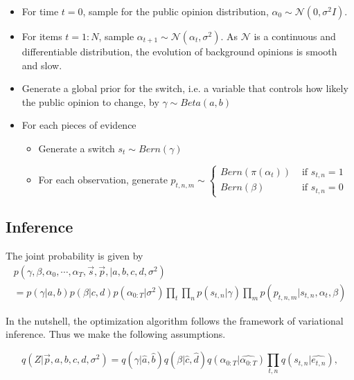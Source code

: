 \documentclass[runningheads]{llncs}
\newcommand{\Gaussian}{\mathcal{N}}
\begin{document}
\vspace{-0.6cm}
\begin{itemize}
\item For time $t=0$, sample  for the public opinion distribution, $\alpha_0\sim \Gaussian(0,\sigma^2 I)$.
\item For items $t=1: N$, sample $\alpha_{t+1}\sim \Gaussian(\alpha_t,\sigma^2)$. As $\Gaussian$ is a continuous and differentiable distribution, the evolution of background opinions is smooth and slow.
\item Generate a global prior for the switch, i.e. a variable that controls how likely the public opinion to change, by $\gamma\sim Beta(a,b)$
\end{itemize}
\begin{itemize}
\item For each pieces of evidence
\begin{itemize}
\item Generate a switch $s_t \sim Bern(\gamma)$
\item For each observation, generate $p_{t,n,m}\sim \begin{cases}
Bern(\pi(\alpha_t)) & \text{ if } s_{t,n}= 1\\ 
Bern(\beta) & \text{ if } s_{t,n}= 0 
\end{cases}$
\end{itemize}
\end{itemize}





\vspace{-0.6cm}
\subsection{Inference}
The joint probability is given by
\begin{multline}
    p(\gamma,\beta,\alpha_0,\cdots,\alpha_T, \vec{s},\vec{p}, |a,b,c,d,\sigma^2) \\
    =    p(\gamma|a,b) p(\beta|c,d)  p(\alpha_{0:T}|\sigma^2) \prod_t \prod_ n p(s_{t,n}|\gamma) \prod_m p(p_{t,n,m}|s_{t,n},\alpha_t,\beta) 
\end{multline}
\vspace{-0.6cm}


    
In the nutshell, the optimization algorithm follows the framework of variational inference. Thus we make the following assumptions. 

\vspace{-0.6cm}
\begin{equation*}
q(Z|\vec{p},a,b,c,d,\sigma^2) = q(\gamma|\hat{a},\hat{b}) q(\beta|\hat{c},\hat{d}) q(\alpha_{0:T}|\hat{\alpha_{0:T}})\prod_{t,n} q(s_{t,n}|\hat{e_{t,n}}) , 
\end{equation*}
\vspace{-0.6cm}
\end{document}
